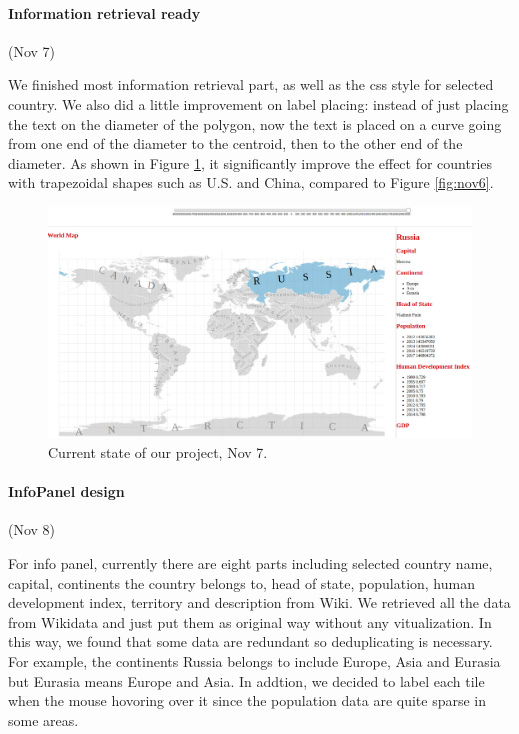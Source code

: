 \documentclass[12pt, fullpage,letterpaper]{article}
\begin{document}
\newpage
\paragraph{Information retrieval ready} (Nov 7)

We finished most information retrieval part, as well as the css style for selected country.
We also did a little improvement on label placing:
instead of just placing the text on the diameter of the polygon, now the text is placed on a curve
going from one end of the diameter to the centroid, then to the other end of the diameter.
As shown in Figure \ref{fig:nov7}, it significantly improve the effect for countries with trapezoidal shapes such as U.S. and China, compared
to Figure \ref{fig:nov6}.

\begin{figure}[h!]
    \begin{center}
        \includegraphics[width=\textwidth]{figs/Nov7.jpg}
        \caption{Current state of our project, Nov 7.}
        \label{fig:nov7}
    \end{center}
\end{figure}

\newpage
\paragraph{InfoPanel design} (Nov 8)

For info panel, currently there are eight parts including selected country name, capital, continents the country belongs to, head of state, population, human development index, territory and description from Wiki.
We retrieved all the data from Wikidata and just put them as original way without any vitualization.
In this way, we found that some data are redundant so deduplicating is necessary.
For example, the continents Russia belongs to include Europe, Asia and Eurasia but Eurasia means Europe and Asia.
In addtion, we decided to label each tile when the mouse hovoring over it since the population data are quite sparse in some areas.
\end{document}
